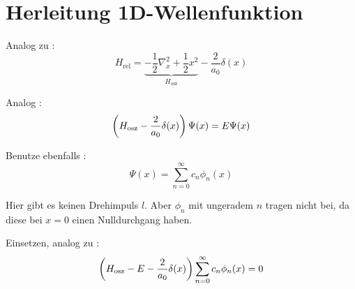 
\chapter{Herleitung 1D-Wellenfunktion}

\newcommand\br[1]{\parencite[(#1)]{Busch/Two_Cold}}

Analog zu \br2:
\[
    H_\text{rel} =
    \underbrace{- \frac12 \nabla_x^2 + \frac 12 x^2}_{H_\text{osz}} - \frac2{a_0} \delta(x)
\]

Analog \br3:
\[
    \del{H_\text{osz} - \frac2{a_0} \delta(x)} \Psi(x) = E \Psi(x)
\]

Benutze ebenfalls \br4:
\[
    \Psi(x) = \sum_{n=0}^\infty c_n \phi_n(x)
\]

Hier gibt es keinen Drehimpuls $l$. Aber $\phi_n$ mit ungeradem $n$ tragen
nicht bei, da diese bei $x = 0$ einen Nulldurchgang haben.

Einsetzen, analog zu \br5:
\[
    \del{H_\text{osz} - E - \frac2{a_0} \delta(x)}
    \sum_{n=0}^\infty c_n \phi_n(x)
    = 0
\]


